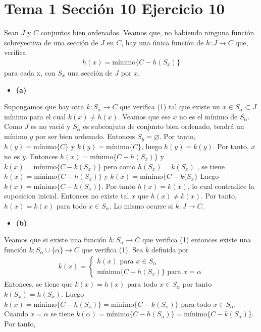 \documentclass{article}
\begin{document}
\section{Tema 1 Sección 10 Ejercicio 10}
Sean $J$ y $C$ conjuntos bien ordenados. Veamos que, no habiendo ninguna función sobreyectiva de una sección de $J$ en $C$, hay una única función de $h:J\rightarrow C$ que, verifica 
\begin{eqnarray}
h(x)=\text{mínimo}\{C-h(S_x)\}
\end{eqnarray}
para cada x, con $S_x$ una sección de $J$ por $x$.
\begin{itemize}
\item \bf(a)\rm
\end{itemize}
Supongamos que hay otra $k:S_{\alpha}\rightarrow C$ que verifica (1) tal que existe un $x\in S_{\alpha}\subset J$ mínimo para el cual $k(x)\neq h(x)$. Veamos que ese $x$ no es el mínimo de $S_{\alpha}$. Como $J$ es no vació y $S_{\alpha}$ es subconjuto de conjunto bien ordenado, tendrá un mínimo $y$ por ser bien ordenado. Entonces $S_{y}=\varnothing$. Por tanto, $h(y)=\text{mínimo}\{C\}$ y $k(y)=\text{mínimo}\{C\}$, luego $h(y)=k(y)$. Por tanto, $x$ no es $y$. Entonces $h(x)=\text{mínimo}\{C-h(S_x)\}$ y $k(x)=\text{mínimo}\{C-k(S_x)\}$ pero como $h(S_x)=k(S_x)$ , se tiene $h(x)=\text{mínimo}\{C-h(S_x)\}$ y $k(x)=\text{mínimo}\{C-k(S_x\}$ Luego $k(x)=\text{mínimo}\{C-h(S_x)\}$. Por tanto $h(x)=k(x)$, lo cual contradice la suposicion inicial. Entonces no existe tal $x$ que $h(x)\neq k(x)$. Por tanto, $h(x)=k(x)$ para todo $x\in S_{\alpha}$. Lo mismo ocurre si $k:J\rightarrow C$.
\begin{itemize}
\item \bf(b)\rm
\end{itemize}
Veamos que si existe una función $h:S_{\alpha}\rightarrow C$ que verifica (1) entonces existe una función $k:S_{\alpha}\cup\{\alpha\}\rightarrow C$ que verifica (1).
Sea $k$ definida por
\begin{eqnarray}
k(x)=\begin{cases}
h(x)\text{ para } x\in S_{\alpha}\nonumber\\
\text{mínimo}\{C-h(S_x)\}\text{ para }x=\alpha
\end{cases}
\end{eqnarray}
Entonces, se tiene que $k(x)=h(x)$ para todo $x\in S_{\alpha}$ por tanto $k(S_x)=h(S_x)$. Luego $k(x)=\text{mínimo}\{C-h(S_x)\}=\text{mínimo}\{C-k(S_x)\}$ para todo $x\in S_{\alpha}$. Cuando $x=\alpha$ se tiene $k(\alpha)=\text{mínimo}\{C-h(S_\alpha)\}=\text{mínimo}\{C-k(S_\alpha)\}$. Por tanto, 
\end{document}
